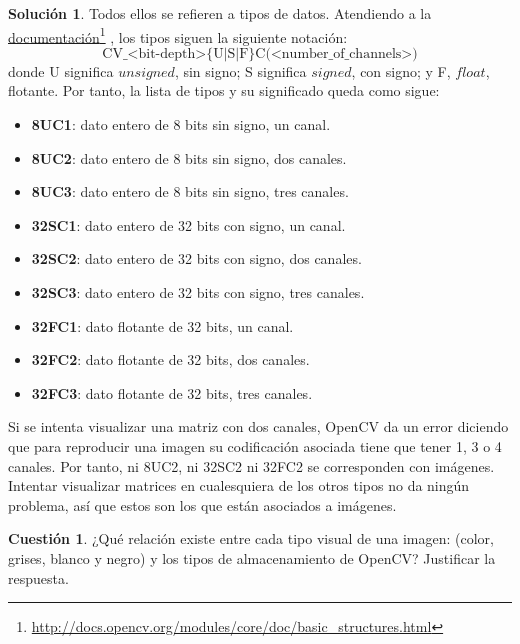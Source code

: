 \documentclass[a4paper, 11pt]{article}
\newcommand\fnurl[2]{%
  \href{#2}{#1}\footnote{\url{#2}}%
}
\theoremstyle{definition}
\newtheorem{cuestion}{Cuestión}
\newtheorem*{solucion}{Solución}
\begin{document}
  \begin{solucion}
      Todos ellos se refieren a tipos de datos. Atendiendo a la \fnurl{documentación}{http://docs.opencv.org/modules/core/doc/basic_structures.html}, los tipos siguen la siguiente notación:
      \[
      \textrm{CV\_<bit-depth>\{U|S|F\}C(<number\_of\_channels>)}
      \]
      donde U significa $unsigned$, sin signo; S significa $signed$, con signo; y F, $float$, flotante. Por tanto, la lista de tipos y su significado queda como sigue:

      \begin{itemize}
          \item \textbf{8UC1}: dato entero de 8 bits sin signo, un canal.
          \item \textbf{8UC2}: dato entero de 8 bits sin signo, dos canales.
          \item \textbf{8UC3}: dato entero de 8 bits sin signo, tres canales.
          \item \textbf{32SC1}: dato entero de 32 bits con signo, un canal.
          \item \textbf{32SC2}: dato entero de 32 bits con signo, dos canales.
          \item \textbf{32SC3}: dato entero de 32 bits con signo, tres canales.
          \item \textbf{32FC1}: dato flotante de 32 bits, un canal.
          \item \textbf{32FC2}: dato flotante de 32 bits, dos canales.
          \item \textbf{32FC3}: dato flotante de 32 bits, tres canales.
      \end{itemize}

      Si se intenta visualizar una matriz con dos canales, OpenCV da un error diciendo que para reproducir una imagen su codificación asociada tiene que tener 1, 3 o 4 canales. Por tanto, ni 8UC2, ni 32SC2 ni 32FC2 se corresponden con imágenes. Intentar visualizar matrices en cualesquiera de los otros tipos no da ningún problema, así que estos son los que están asociados a imágenes.
  \end{solucion}

  \begin{cuestion}
      ¿Qué relación existe entre cada tipo visual de una imagen: (color, grises, blanco y negro) y los tipos de almacenamiento de OpenCV? Justificar la respuesta.
  \end{cuestion}
\end{document}
